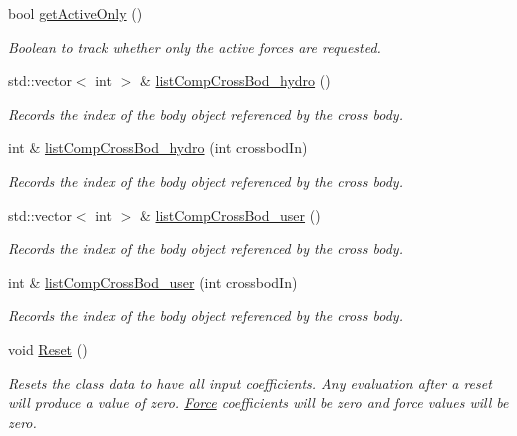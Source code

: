 \begin{DoxyCompactItemize}
bool \hyperlink{classosea_1_1ofreq_1_1_motion_model_afc54a14912e56315505ef5dbec28bd39}{get\-Active\-Only} ()
\begin{DoxyCompactList}\small\item\em Boolean to track whether only the active forces are requested. \end{DoxyCompactList}\item 
std\-::vector$<$ int $>$ \& \hyperlink{classosea_1_1ofreq_1_1_motion_model_ac4169ab37ab7d69f5030a0d67cb3dc86}{list\-Comp\-Cross\-Bod\-\_\-hydro} ()
\begin{DoxyCompactList}\small\item\em Records the index of the body object referenced by the cross body. \end{DoxyCompactList}\item 
int \& \hyperlink{classosea_1_1ofreq_1_1_motion_model_abe445279c6f964b5a64e046945249ea9}{list\-Comp\-Cross\-Bod\-\_\-hydro} (int crossbod\-In)
\begin{DoxyCompactList}\small\item\em Records the index of the body object referenced by the cross body. \end{DoxyCompactList}\item 
std\-::vector$<$ int $>$ \& \hyperlink{classosea_1_1ofreq_1_1_motion_model_a873a325f0017d73989cee1cdf8285b3c}{list\-Comp\-Cross\-Bod\-\_\-user} ()
\begin{DoxyCompactList}\small\item\em Records the index of the body object referenced by the cross body. \end{DoxyCompactList}\item 
int \& \hyperlink{classosea_1_1ofreq_1_1_motion_model_a63d9e54f8cbb434f67753fe737a89ee6}{list\-Comp\-Cross\-Bod\-\_\-user} (int crossbod\-In)
\begin{DoxyCompactList}\small\item\em Records the index of the body object referenced by the cross body. \end{DoxyCompactList}\item 
void \hyperlink{classosea_1_1ofreq_1_1_motion_model_a27842d2b76ab078534c0626601da446b}{Reset} ()
\begin{DoxyCompactList}\small\item\em Resets the class data to have all input coefficients. Any evaluation after a reset will produce a value of zero. \hyperlink{classosea_1_1ofreq_1_1_force}{Force} coefficients will be zero and force values will be zero. \end{DoxyCompactList}\item 

\end{DoxyCompactItemize}
